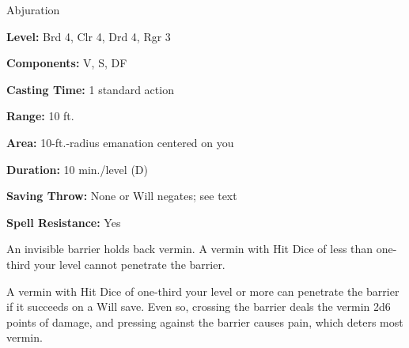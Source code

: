 
Abjuration

\textbf{Level:} Brd 4, Clr 4, Drd 4, Rgr 3

\textbf{Components:} V, S, DF

\textbf{Casting Time:} 1 standard action

\textbf{Range:} 10 ft.

\textbf{Area:} 10-ft.-radius emanation centered on you

\textbf{Duration:} 10 min./level (D)

\textbf{Saving Throw:} None or Will negates; see text

\textbf{Spell Resistance:} Yes

An invisible barrier holds back vermin. A vermin with Hit Dice of less than one-third 
your level cannot penetrate the barrier.

A vermin with Hit Dice of one-third your level or more can penetrate the barrier 
if it succeeds on a Will save. Even so, crossing the barrier deals the vermin 2d6 
points of damage, and pressing against the barrier causes pain, which deters most 
vermin.

